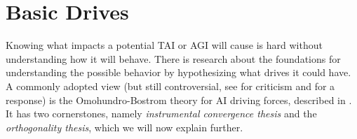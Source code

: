 \documentclass[12pt,A4]{report}
\theoremstyle{definition}
\begin{document}

\section{Basic Drives}
Knowing what impacts a potential TAI or AGI will cause is hard without understanding how it will behave. There is research about the foundations for understanding the possible behavior by hypothesizing what drives it could have. A commonly adopted view (but still controversial, see \citet{MullerCannon} for criticism and \citet{Haggstrom21} for a response) is the Omohundro-Bostrom theory for AI driving forces, described in \citet{Haggstrom19}. It has two cornerstones, namely \textit{instrumental convergence thesis} and the \textit{orthogonality thesis}, which we will now explain further.

\end{document}
